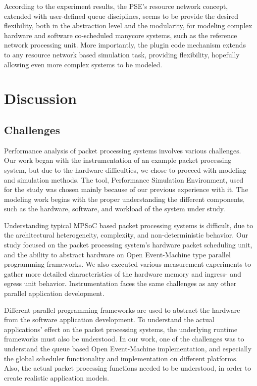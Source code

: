 According to the experiment results, the PSE's resource network concept, extended with user-defined queue disciplines, seems to be provide the desired flexibility, both in the abstraction level and the modularity, for modeling complex hardware and software co-scheduled manycore systems, such as the reference network processing unit. More importantly, the plugin code mechanism extends to any resource network based simulation task, providing flexibility, hopefully allowing even more complex systems to be modeled.

\section{Discussion}

\subsection{Challenges}
Performance analysis of packet processing systems involves various challenges. Our work began with the instrumentation of an example packet processing system, but due to the hardware difficulties, we chose to proceed with modeling and simulation methods. The tool, Performance Simulation Environment, used for the study was chosen mainly because of our previous experience with it. The modeling work begins with the proper understanding the different components, such as the hardware, software, and workload of the system under study.

Understanding typical MPSoC based packet processing systems is difficult, due to the architectural heterogeneity, complexity, and non-deterministic behavior. Our study focused on the packet processing system's hardware packet scheduling unit, and the ability to abstract hardware on Open Event-Machine type parallel programming frameworks. We also executed various measurement experiments to gather more detailed characteristics of the hardware memory and ingress- and egress unit behavior. Instrumentation faces the same challenges as any other parallel application development.

Different parallel programming frameworks are used to abstract the hardware from the software application development. To understand the actual applications' effect on the packet processing systems, the underlying runtime frameworks must also be understood. In our work, one of the challenges was to understand the queue based Open Event-Machine implementation, and especially the global scheduler functionality and implementation on different platforms. Also, the actual packet processing functions needed to be understood, in order to create realistic application models.

